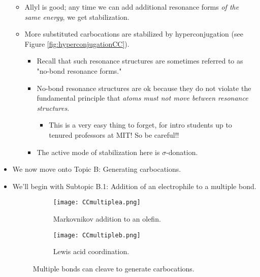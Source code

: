 \documentclass[../notes.tex]{subfiles}
\begin{document}
\begin{itemize}
\begin{itemize}
\begin{itemize}
\begin{itemize}
            \end{itemize}
        \end{itemize}
        \pagebreak
        \item Allyl is good; any time we can add additional resonance forms \emph{of the same energy}, we get stabilization.
        \item More substituted carbocations are stabilized by hyperconjugation (see Figure \ref{fig:hyperconjugationCC}).
        \begin{itemize}
            \item Recall that such resonance structures are sometimes referred to as "no-bond resonance forms."
            \item No-bond resonance structures are ok because they do not violate the fundamental principle that \emph{atoms must not move between resonance structures}.
            \begin{itemize}
                \item This is a very easy thing to forget, for intro students up to tenured professors at MIT! So be careful!!
            \end{itemize}
            \item The active mode of stabilization here is $\sigma$-donation.
        \end{itemize}
    \end{itemize}
    \item We now move onto Topic B: Generating carbocations.
    \item We'll begin with Subtopic B.1: Addition of an electrophile to a multiple bond.
    \begin{figure}[h!]
        \centering
        \begin{subfigure}[b]{0.45\linewidth}
            \centering
            \texttt{[image: CCmultiplea.png]}
            \caption{Markovnikov addition to an olefin.}
            \label{fig:CCmultiplea}
        \end{subfigure}
        \begin{subfigure}[b]{0.45\linewidth}
            \centering
            \texttt{[image: CCmultipleb.png]}
            \caption{Lewis acid coordination.}
            \label{fig:CCmultipleb}
        \end{subfigure}
        \caption{Multiple bonds can cleave to generate carbocations.}
        \label{fig:CCmultiple}
    \end{figure}
    \begin{itemize}

\end{itemize}
\end{itemize}
\end{document}
